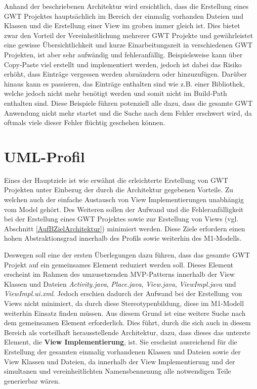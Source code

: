 Anhand der beschriebenen Architektur wird ersichtlich, dass die Erstellung eines
GWT Projektes hauptsächlich im Bereich der einmalig vorhanden Dateien und
Klassen und die Erstellung einer View im groben immer gleich ist. Dies bietet
zwar den Vorteil der Vereinheitlichung mehrerer GWT Projekte und gewährleistet
eine gewisse Übersichtlichkeit und kurze Einarbeitungszeit in verschiedenen GWT
Projekten, ist aber sehr aufwändig und fehleranfällig. Beispielsweise kann über
\grqq{}Copy-Paste\grqq{} viel erstellt und implementiert werden, jedoch ist
dabei das Risiko erhöht, dass Einträge vergessen werden abzuändern oder
hinzuzufügen. Darüber hinaus kann es passieren, das Einträge enthalten sind wie
z.B. einer Bibliothek, welche jedoch nicht mehr benötigt werden und somit nicht
im Build-Path enthalten sind.
Diese Beispiele führen potenziell alle dazu, dass die gesamte GWT Anwendung nicht mehr startet
und die Suche nach dem Fehler erschwert wird, da oftmals viele dieser
Fehler flüchtig geschehen können. 
\section{UML-Profil}\label{AufBProfil}
Eines der Hauptziele ist wie erwähnt die erleichterte Erstellung von GWT
Projekten unter Einbezug der durch die Architektur gegebenen Vorteile. Zu
welchen auch der einfache Austausch von View Implementierungen unabhängig vom Model
gehört. Des Weiteren sollen der Aufwand und die Fehleranfälligkeit bei der
Erstellung eines GWT Projektes sowie zur Erstellung von Views (vgl.
Abschnitt \ref{AufBZielArchitektur}) minimiert werden. Diese Ziele
erfordern einen hohen Abstraktionsgrad innerhalb des Profils sowie weiterhin des
M1-Modells.

Deswegen soll eine der ersten Überlegungen dazu führen, dass das
gesamte GWT Projekt auf ein gemeinsames Element reduziert werden soll. Dieses
Element erscheint im Rahmen des umzusetzenden
MVP-Patterns innerhalb der View Klassen und Dateien
\textit{Activity.java}, \textit{Place.java},
\textit{View.java}, \textit{ViewImpl.java}
und \textit{ViewImpl.ui.xml}. Jedoch erschien dadurch der Aufwand bei der
Erstellung von Views nicht minimiert, da durch diese Stereotypenbildung, diese
im M1-Modell weiterhin Einsatz finden müssen. Aus diesem Grund ist eine weitere
Suche nach dem gemeinsamen Element erforderlich. Dies führt, durch die sich
auch in diesem Bereich als vorteilhaft herausstellende Architektur, dazu, dass
dieses das unterste Element, die \textbf{View Implementierung}, ist. Sie
erscheint ausreichend für die Erstellung der gesamten einmalig vorhandenen Klassen und
Dateien sowie der View Klassen und Dateien, da innerhalb der View
Implementierung und der simultanen und vereinheitlichten Namensbennenung alle
notwendigen Teile generierbar wären. 

